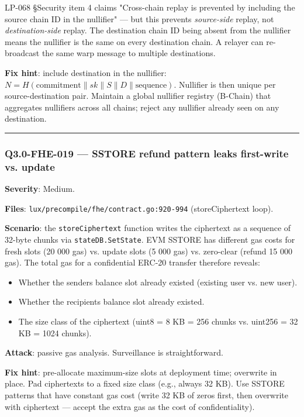 \documentclass[
]{article}
\providecommand{\tightlist}{%
  \setlength{\itemsep}{0pt}\setlength{\parskip}{0pt}}
\begin{document}
LP-068 §Security item 4 claims "Cross-chain replay is prevented by
including the source chain ID in the nullifier" --- but this prevents
\emph{source-side} replay, not \emph{destination-side} replay. The
destination chain ID being absent from the nullifier means the nullifier
is the same on every destination chain. A relayer can re-broadcast the
same warp message to multiple destinations.

\textbf{Fix hint}: include destination in the nullifier:
\(N = H(\text{commitment} \| sk \| S \| D \| \text{sequence})\).
Nullifier is then unique per source-destination pair. Maintain a global
nullifier registry (B-Chain) that aggregates nullifiers across all
chains; reject any nullifier already seen on any destination.

\begin{center}\rule{0.5\linewidth}{0.5pt}\end{center}

\subsubsection{Q3.0-FHE-019 --- SSTORE refund pattern leaks first-write
vs.
update}\label{q30-fhe-019--sstore-refund-pattern-leaks-first-write-vs-update}

\textbf{Severity}: Medium.

\textbf{Files}: \texttt{lux/precompile/fhe/contract.go:920-994}
(storeCiphertext loop).

\textbf{Scenario}: the \texttt{storeCiphertext} function writes the
ciphertext as a sequence of 32-byte chunks via
\texttt{stateDB.SetState}. EVM SSTORE has different gas costs for fresh
slots (20 000 gas) vs. update slots (5 000 gas) vs. zero-clear (refund
15 000 gas). The total gas for a confidential ERC-20 transfer therefore
reveals:

\begin{itemize}
\tightlist
\item
  Whether the sender\textquotesingle s balance slot already existed
  (existing user vs. new user).
\item
  Whether the recipient\textquotesingle s balance slot already existed.
\item
  The size class of the ciphertext (uint8 = 8 KB = 256 chunks vs.
  uint256 = 32 KB = 1024 chunks).
\end{itemize}

\textbf{Attack}: passive gas analysis. Surveillance is straightforward.

\textbf{Fix hint}: pre-allocate maximum-size slots at deployment time;
overwrite in place. Pad ciphertexts to a fixed size class (e.g., always
32 KB). Use SSTORE patterns that have constant gas cost (write 32 KB of
zeros first, then overwrite with ciphertext --- accept the extra gas as
the cost of confidentiality).
\end{document}
